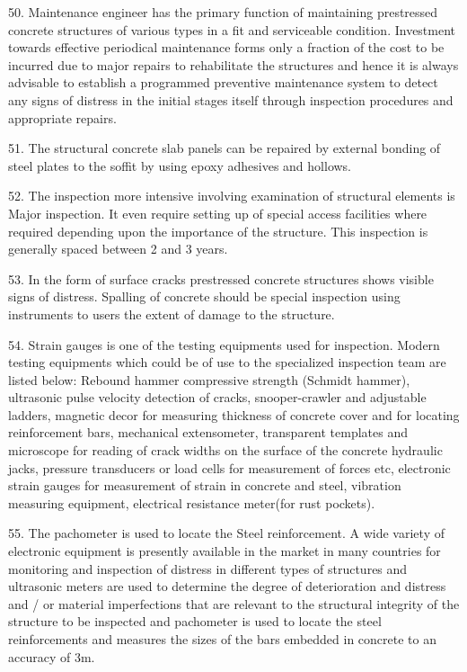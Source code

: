 \documentclass[11pt,a4paper]{article}
\begin{document}
50.
Maintenance engineer has the primary function of maintaining prestressed concrete structures of various types in a fit and serviceable condition. Investment towards effective periodical maintenance forms only a fraction of the cost to be incurred due to major repairs to rehabilitate the structures and hence it is always advisable to establish a programmed preventive maintenance system to detect any signs of distress in the initial stages itself through inspection procedures and appropriate repairs.

51.
The structural concrete slab panels can be repaired by external bonding of steel plates to the soffit by using epoxy adhesives and hollows.

52.
The inspection more intensive involving examination of structural elements is Major inspection. It even require setting up of special access facilities where required depending upon the importance of the structure. This inspection is generally spaced between 2 and 3 years.

53.
In the form of surface cracks prestressed concrete structures shows visible signs of distress. Spalling of concrete should be special inspection using instruments to users the extent of damage to the structure.

54.
Strain gauges is one of the testing equipments used for inspection. Modern testing equipments which could be of use to the specialized inspection team are listed below:
Rebound hammer compressive strength (Schmidt hammer), ultrasonic pulse velocity detection of cracks, snooper-crawler and adjustable ladders, magnetic decor for measuring thickness of concrete cover and for locating reinforcement bars, mechanical extensometer, transparent templates and microscope for reading of crack widths on the surface of the concrete hydraulic jacks, pressure transducers or load cells for measurement of forces etc, electronic strain gauges for measurement of strain in concrete and steel, vibration measuring equipment, electrical resistance meter(for rust pockets).

55.
The pachometer is used to locate the Steel reinforcement. A wide variety of electronic equipment is presently available in the market in many countries for monitoring and inspection of distress in different types of structures and ultrasonic meters are used to determine the degree of deterioration and distress and / or material imperfections that are relevant to the structural integrity of the structure to be inspected and pachometer is used to locate the steel reinforcements and measures the sizes of the bars embedded in concrete to an accuracy of 3m.
\end{document}
